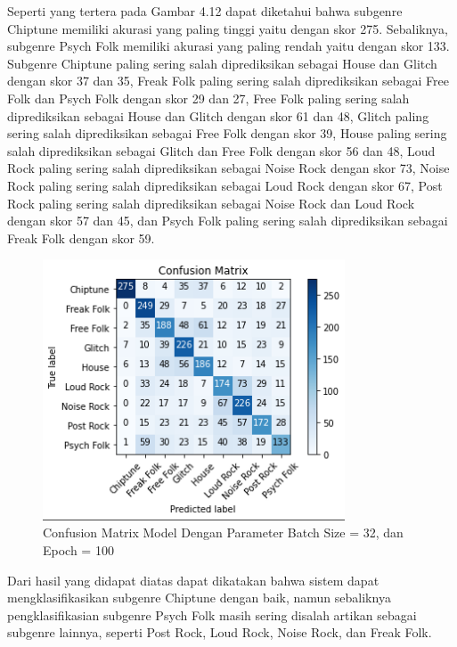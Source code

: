 \begin{enumerate}
	Seperti yang tertera pada Gambar 4.12 dapat diketahui bahwa subgenre Chiptune memiliki akurasi yang paling tinggi yaitu dengan skor 275. Sebaliknya, subgenre Psych Folk memiliki akurasi yang paling rendah yaitu dengan skor 133. Subgenre Chiptune paling sering salah diprediksikan sebagai House dan Glitch dengan skor 37 dan 35, Freak Folk paling sering salah diprediksikan sebagai Free Folk dan Psych Folk dengan skor 29 dan 27, Free Folk paling sering salah diprediksikan sebagai House dan Glitch dengan skor 61 dan 48, Glitch paling sering salah diprediksikan sebagai Free Folk dengan skor 39, House paling sering salah diprediksikan sebagai Glitch dan Free Folk dengan skor 56 dan 48, Loud Rock paling sering salah diprediksikan sebagai Noise Rock dengan skor 73, Noise Rock paling sering salah diprediksikan sebagai Loud Rock dengan skor 67, Post Rock paling sering salah diprediksikan sebagai Noise Rock dan Loud Rock dengan skor 57 dan 45, dan Psych Folk paling sering salah diprediksikan sebagai Freak Folk dengan skor 59.
	
	\begin{figure}[H]
		\centering
		
		\includegraphics[width=0.8\textwidth]{gambar/confusion matrix_b32_e100}
		
		\caption{Confusion Matrix Model Dengan Parameter Batch Size = 32, dan Epoch = 100}
		\label{fig:cm_b32_e100}
	\end{figure}

\end{enumerate}

Dari hasil yang didapat diatas dapat dikatakan bahwa sistem dapat mengklasifikasikan subgenre Chiptune dengan baik, namun sebaliknya pengklasifikasian subgenre Psych Folk masih sering disalah artikan sebagai subgenre lainnya, seperti Post Rock, Loud Rock, Noise Rock, dan Freak Folk.

